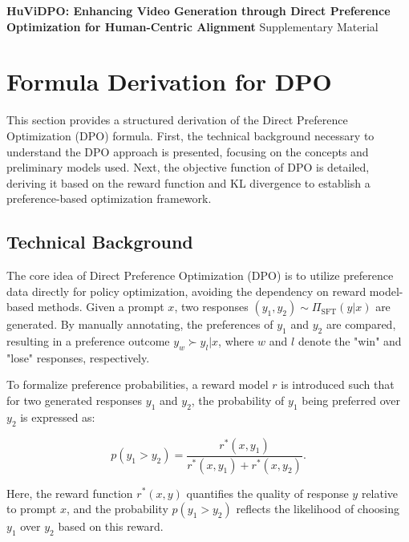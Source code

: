 \clearpage

\setcounter{page}{1}
\appendix
\onecolumn %
\begin{center}
\Large
\textbf{HuViDPO: Enhancing Video Generation through Direct Preference
Optimization for Human-Centric Alignment} \vspace{0.5em} Supplementary Material 
\end{center}



\section{Formula Derivation for DPO}
This section provides a structured derivation of the Direct Preference Optimization (DPO) formula. First, the technical background necessary to understand the DPO approach is presented, focusing on the concepts and preliminary models used. Next, the objective function of DPO is detailed, deriving it based on the reward function and KL divergence to establish a preference-based optimization framework.

\subsection{Technical Background}
The core idea of Direct Preference Optimization (DPO) is to utilize preference data directly for policy optimization, avoiding the dependency on reward model-based methods. Given a prompt \( x \), two responses \( (y_1, y_2) \sim \Pi_{\text{SFT}}(y | x) \) are generated. By manually annotating, the preferences of \( y_1 \) and \( y_2 \) are compared, resulting in a preference outcome \( y_w \succ y_l | x \), where \( w \) and \( l \) denote the "win" and "lose" responses, respectively.

To formalize preference probabilities, a reward model \( r \) is introduced such that for two generated responses \( y_1 \) and \( y_2 \), the probability of \( y_1 \) being preferred over \( y_2 \) is expressed as:

\begin{equation}
p(y_1 > y_2) = \frac{r^*(x, y_1)}{r^*(x, y_1) + r^*(x, y_2)}.
\end{equation}

Here, the reward function \( r^*(x, y) \) quantifies the quality of response \( y \) relative to prompt \( x \), and the probability \( p(y_1 > y_2) \) reflects the likelihood of choosing \( y_1 \) over \( y_2 \) based on this reward.


